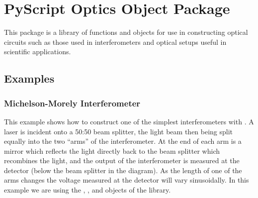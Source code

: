 % 
%
%


\chapter{PyScript Optics Object Package}

This package is a library of functions and objects for use in constructing
optical circuits such as those used in interferometers and optical setups
useful in scientific applications.

\section{Examples}

\subsection{Michelson-Morely Interferometer}

This example shows how to construct one of the simplest interferometers with
\pyscript.  A laser is incident onto a 50:50 beam splitter, the light beam
then being split equally into the two ``arms'' of the interferometer.  At
the end of each arm is a mirror which reflects the light directly back to
the beam splitter which recombines the light, and the output of the
interferometer is measured at the detector (below the beam splitter in the
diagram).  As the length of one of the arms changes the voltage measured at
the detector will vary sinusoidally.  In this example we are using the
, ,  and  objects of the
 library.

